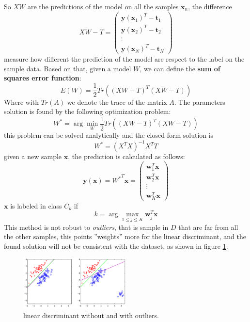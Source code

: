 \documentclass[10pt, letterpaper]{report}
\begin{document}
So $XW$ are the predictions of the model on all the samples $\mathbf x_n$, the difference\begin{equation}
    XW-T = \begin{pmatrix}
        \mathbf y(\mathbf x_1)^T-\mathbf t_1\\ 
        \mathbf y(\mathbf x_2)^T-\mathbf t_2\\ 
        \vdots \\ 
        \mathbf y(\mathbf x_N)^T-\mathbf t_N
    \end{pmatrix}
\end{equation}
measure how different the prediction of the model are respect to the label on the sample data. Based on that, given a model $W$, we can define the \textbf{sum of squares error function}:\begin{equation}
    E(W)=\frac{1}{2}Tr\left( (XW-T)^T(XW-T) \right)
\end{equation}
Where with $Tr(A)$ we denote the trace of the matrix $A$. The parameters solution is found by the following optimization problem: \begin{equation}
    W^*=\arg\min_W\frac{1}{2}Tr\left( (XW-T)^T(XW-T) \right)
\end{equation}
this problem can be solved analytically and  the closed form solution is\begin{equation}
    W^*=(X^TX)^{-1}X^TT
\end{equation}
given a new sample $\mathbf x$, the prediction is calculated as follows:\begin{equation}
    \mathbf y(\mathbf x)={W^*}^T\mathbf x = \begin{pmatrix}
        \mathbf w_1^T\mathbf x\\ 
        \mathbf w_2^T\mathbf x\\ 
        \vdots \\ 
        \mathbf w_K^T\mathbf x
    \end{pmatrix}
\end{equation}
$\mathbf x$ is labeled in class $C_k$ if\begin{equation}
    k=\arg\max_{1\le j\le K}\mathbf w_j^T\mathbf x
\end{equation}
This method is not robust to \textit{outliers}, that is sample in $D$ that are far from all the other samples, this points ''weights'' more for the linear discriminant, and the found solution will not be consistent with the dataset, as shown in figure \ref{fig:outliers}.

\begin{figure}[h!]
    \centering
    \includegraphics[width=0.5\textwidth]{images/outliers.png}
    \caption{linear discriminant without and with outliers.}
    \label{fig:outliers}
\end{figure}
\end{document}
